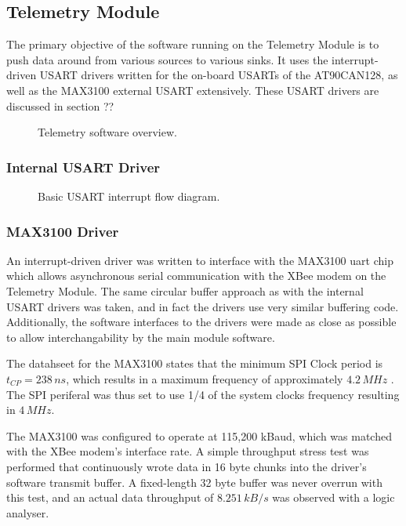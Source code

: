 \subsection{Telemetry Module}

The primary objective of the software running on the Telemetry Module is to push data around from various sources to various sinks. It uses the interrupt-driven USART drivers written for the on-board USARTs of the AT90CAN128, as well as the MAX3100 external USART extensively. These USART drivers are discussed in section ?? 

\begin{figure}[H]
\centering

\caption{Telemetry software overview.}
\label{fig:telemetry_software_implementation}
\end{figure}

\subsubsection{Internal USART Driver}

\begin{figure}[]
\centering

\caption{Basic USART interrupt flow diagram.}
\label{fig:usart_driver_flow}
\end{figure}


\subsubsection{MAX3100 Driver}

An interrupt-driven driver was written to interface with the MAX3100 uart chip which allows asynchronous serial communication with the XBee modem on the Telemetry Module. The same circular buffer approach as with the internal USART drivers was taken, and in fact the drivers use very similar buffering code. Additionally, the software interfaces to the drivers were made as close as possible to allow interchangability by the main module software.

The datahseet for the MAX3100 states that the minimum SPI Clock period is $t_{CP}=238\, ns$, which results in a maximum frequency of approximately $4.2\, MHz$ \cite{MAX3100}. The SPI periferal was thus set to use 1/4 of the system clocks frequency resulting in $4\, MHz$.

The MAX3100 was configured to operate at 115,200 kBaud, which was matched with the XBee modem's interface rate. A simple throughput stress test was performed that continuously wrote data in 16 byte chunks into the driver's software transmit buffer. A fixed-length 32 byte buffer was never overrun with this test, and an actual data throughput of $8.251\, kB/s$ was observed with a logic analyser.

